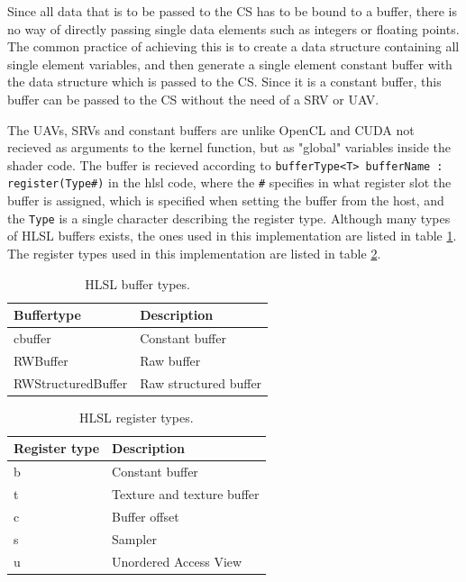 Since all data that is to be passed to the CS has to be bound to a buffer, there is no way of directly passing single data elements such as integers or floating points. The common practice of achieving this is to create a data structure containing all single element variables, and then generate a single element constant buffer with the data structure which is passed to the CS. Since it is a constant buffer, this buffer can be passed to the CS without the need of a SRV or UAV.

The UAVs, SRVs and constant buffers are unlike OpenCL and CUDA not recieved as arguments to the kernel function, but as "global" variables inside the shader code. The buffer is recieved according to \lstinline{bufferType<T> bufferName : register(Type#)} in the hlsl code, where the \lstinline{#} specifies in what register slot the buffer is assigned, which is specified when setting the buffer from the host, and the \lstinline{Type} is a single character describing the register type. Although many types of HLSL buffers exists, the ones used in this implementation are listed in table \ref{tab:HLSLBufferTypes}. The register types used in this implementation are listed in table \ref{tab:HLSLRegTypes}.


\begin{table}
    \begin{tabularx}{\textwidth}{ |X|X| }
      \hline
      \rowcolor{gray}
      \textbf{Buffertype}   & \textbf{Description}  \\ \hline 
      cbuffer               & Constant buffer       \\ \hline
      RWBuffer              & Raw buffer            \\ \hline
      RWStructuredBuffer    & Raw structured buffer \\ \hline
    \end{tabularx}
\caption{\label{tab:HLSLBufferTypes} HLSL buffer types.}
\end{table}

\begin{table}
    \begin{tabularx}{\textwidth}{ |X|X| }
      \hline
      \rowcolor{gray}
      \textbf{Register type}   & \textbf{Description}  \\ \hline 
      b & Constant buffer               \\ \hline
      t & Texture and texture buffer    \\ \hline
      c & Buffer offset                 \\ \hline
      s & Sampler                       \\ \hline
      u & Unordered Access View         \\ \hline
    \end{tabularx}
\caption{\label{tab:HLSLRegTypes} HLSL register types.}
\end{table}



